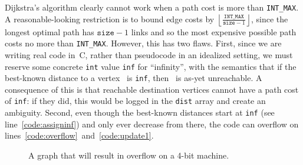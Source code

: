 Dijkstra's algorithm clearly cannot work when a path
cost is more than \texttt{INT\_MAX}.  A reasonable-looking restriction
is to bound edge costs by
$\left\lfloor\frac{\texttt{INT\_MAX}}{\texttt{size}-1}\right\rfloor$, since
the longest optimal path has $\texttt{size}-1$ links and so the
most expensive possible path costs no more than \texttt{INT\_MAX}.
However, this has two flaws.  First, since we are writing real code in~C,
rather than pseudocode in an idealized setting, we must reserve some
concrete \texttt{int} value \texttt{inf} for ``infinity'', with
the semantics that if the best-known distance to a vertex~
is \texttt{inf}, then~ is as-yet unreachable.
A consequence of this is that reachable destination vertices cannot have a
path cost of \texttt{inf}: if they did, this would be logged in the
\texttt{dist} array and create an ambiguity.
Second, even though the best-known distances start at \texttt{inf}
(see line~\ref{code:assigninf}) and only ever decrease from there, the code can
overflow on lines~\ref{code:overflow}~and~\ref{code:update1}.

\begin{figure}[t]
\centering
{}
\caption{A graph that will result in overflow on a 4-bit machine.}
\label{fig:overflow}
\end{figure}

